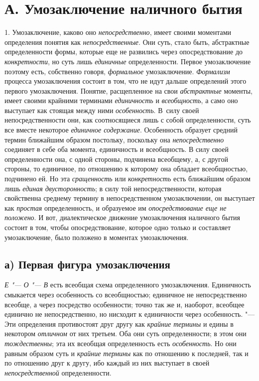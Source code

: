 {{\section[А. Умозаключение наличного бытия]{А. Умозаключение наличного бытия}
1. Умозаключение, каково оно
{\em непосредственно},
имеет своими моментами определения понятия как
{\em непосредственные}.
Они суть, стало быть, абстрактные определенности формы,
которые еще не развились через опосредствование до
{\em конкретности}, но
суть лишь {\em единичные}
определенности. Первое умозаключение поэтому есть,
собственно говоря,
{\em формальное}
умозаключение.
{\em Формализм} процесса
умозаключения состоит в том, что не идут дальше определений этого первого
умозаключения. Понятие, расщепленное на свои
{\em абстрактные}
моменты, имеет своими крайними терминами
{\em единичность} и
{\em всеобщность}, а само
оно выступает как стоящая между ними
{\em особенность}. В~силу
своей непосредственности они, как соотносящиеся лишь с собой
определенности, суть все вместе некоторое
{\em единичное содержание}.
Особенность образует средний термин ближайшим образом
постольку, поскольку она
{\em непосредственно}
соединяет в себе оба момента, единичность и всеобщность. В
силу своей определенности она, с одной стороны, подчинена всеобщему, а, с
другой стороны, то единичное, по отношению к которому она обладает
всеобщностью, подчинено ей. Но эта
{\em сращенность} или
{\em конкретность}
есть ближайшим образом лишь
{\em единая двусторонность};
в силу той непосредственности, которая свойственна среднему
термину в непосредственном умозаключении, он выступает как
{\em простая}
определенность, и образуемое им
{\em опосредствование еще не положено}.
И вот, диалектическое движение умозаключения наличного бытия
состоит в том, чтобы опосредствование, которое одно только и составляет
умозаключение, было положено в моментах умозаключения.

\subsection[а) Первая фигура умозаключения]{а) Первая фигура умозаключения}
{\em Е "--- О "--- В}
есть всеобщая схема определенного умозаключения. Единичность
смыкается через особенность со всеобщностью; единичное не непосредственно
всеобще, а через посредство особенности; точно так же и, наоборот, всеобщее
единично не непосредственно, но нисходит к единичности через особенность.
"--- Эти определения противостоят друг другу как
{\em крайние термины} и
едины в некотором {\em отличном}
от них третьем. Оба они суть определенности; в этом они
{\em тождественны}; эта
их всеобщая определенность есть
{\em особенность}. Но они
равным образом суть и {\em крайние
термины} как по отношению к последней, так и по отношению
друг к другу, ибо каждый из них выступает в своей
{\em непосредственной}
определенности.

}}
